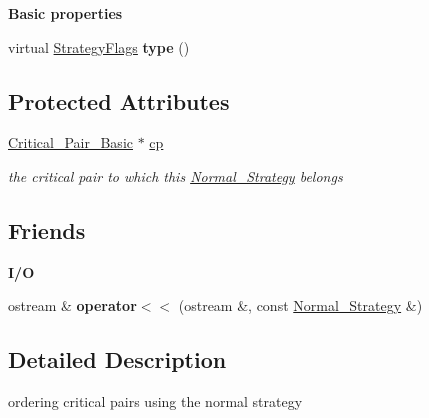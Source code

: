 \begin{Indent}\textbf{ Basic properties}\par
\begin{DoxyCompactItemize}
\item 
\mbox{\label{class_normal___strategy_a5ec1a6aa131857892894a12a623f37f9}} 
virtual \hyperlink{group__strategygroup_ga0ee6c8e033547330e6b89929730007f4}{Strategy\+Flags} {\bfseries type} ()
\end{DoxyCompactItemize}
\end{Indent}
\subsection*{Protected Attributes}
\begin{DoxyCompactItemize}
\item 
\mbox{\label{class_normal___strategy_aac4e370079c1b86ee307c0e400110925}} 
\hyperlink{class_critical___pair___basic}{Critical\+\_\+\+Pair\+\_\+\+Basic} $\ast$ \hyperlink{class_normal___strategy_aac4e370079c1b86ee307c0e400110925}{cp}
\begin{DoxyCompactList}\small\item\em the critical pair to which this {\ttfamily \hyperlink{class_normal___strategy}{Normal\+\_\+\+Strategy}} belongs \end{DoxyCompactList}\end{DoxyCompactItemize}
\subsection*{Friends}
\begin{Indent}\textbf{ I/O}\par
\begin{DoxyCompactItemize}
\item 
\mbox{\label{class_normal___strategy_a735354f98e00c89dd87f890d65c984aa}} 
ostream \& {\bfseries operator$<$$<$} (ostream \&, const \hyperlink{class_normal___strategy}{Normal\+\_\+\+Strategy} \&)
\end{DoxyCompactItemize}
\end{Indent}


\subsection{Detailed Description}
ordering critical pairs using the normal strategy 

